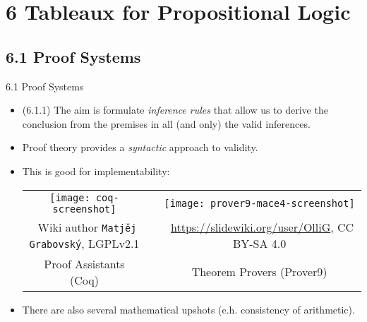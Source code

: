 \documentclass[../slides.tex]{subfiles}
\begin{document}
\section{6 Tableaux for Propositional Logic}
\subsection{6.1 Proof Systems}

\begin{frame}{6.1 Proof Systems}

	\begin{itemize}
	
		\item (6.1.1) The aim is formulate \emph{inference rules} that allow us to derive the conclusion from the premises in all (and only) the valid inferences.

		\item Proof theory provides a \emph{syntactic} approach to validity.
				
		\item This is good for implementability:
		
		\begin{center}
			\begin{tabular}{c c c}
				
				\texttt{[image: coq-screenshot]} & &					\texttt{[image: prover9-mace4-screenshot]} \\
				{\tiny \textcopyright~Wiki author \texttt{Matj\v{e}j Grabovsk\'y}, LGPLv2.1} & &{\tiny \textcopyright~\url{https://slidewiki.org/user/OlliG}, CC BY-SA 4.0} \\[1ex]

				Proof Assistants (Coq) &\qquad & Theorem Provers (Prover9)

			\end{tabular}
		\end{center}
		
		\item There are also several mathematical upshots (e.h. consistency of arithmetic).
						
		\end{itemize}

\end{frame}
\end{document}
